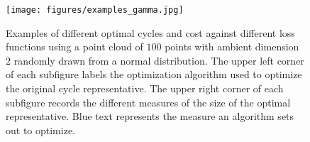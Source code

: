 \DIFaddend \begin{landscape}
\begin{figure}[hbt!]
\begin{center}
\DIFdelbeginFL %
\DIFdelendFL \DIFaddbeginFL \texttt{[image: figures/examples\_gamma.jpg]}
\DIFaddendFL \end{center}
\caption{Examples of different optimal cycles and cost against different loss functions using a point cloud of $100$ points with ambient dimension $2$ randomly drawn from a normal distribution. The upper left corner of each subfigure labels the optimization algorithm used to optimize the original cycle representative. The upper right corner of each subfigure records the different measures of the size of the optimal representative. Blue text represents the measure an algorithm sets out to optimize. 
}\label{fig:Examplesofeachoptimalcycles} 
\end{figure}
\end{landscape}

